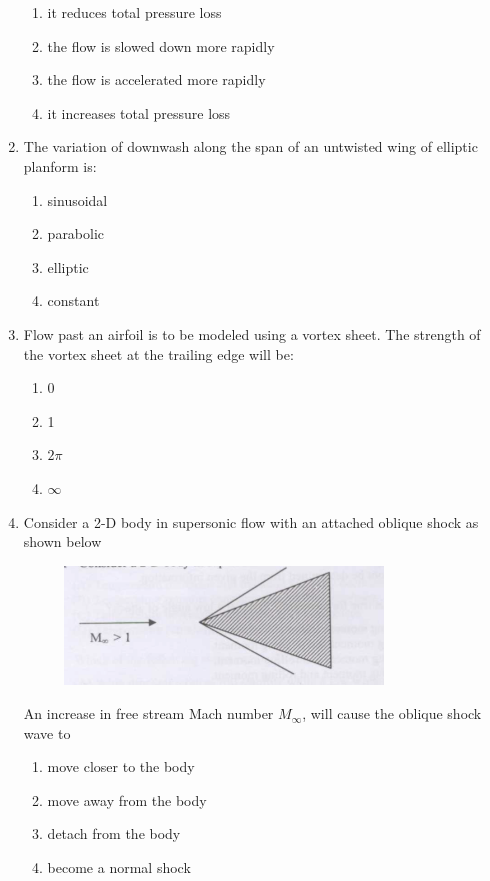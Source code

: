 \documentclass[journal]{IEEEtran}
\begin{document}
\begin{enumerate}[start=35]
\begin{enumerate}
    \item it reduces total pressure loss
    \item the flow is slowed down more rapidly
    \item the flow is accelerated more rapidly
    \item it increases total pressure loss
\end{enumerate}
\item The variation of downwash along the span of an untwisted wing of elliptic planform is:
\begin{enumerate}
    \item sinusoidal
    \item parabolic
    \item elliptic
    \item constant
\end{enumerate}
\item Flow past an airfoil is to be modeled using a vortex sheet. The strength of the vortex sheet at the trailing edge will be:
\begin{enumerate}
    \item 0
    \item 1
    \item $2\pi$
    \item $\infty$
\end{enumerate}
\item Consider a 2-D body in supersonic flow with an attached oblique shock as shown below 
\begin{figure}[h]
    \centering
    \includegraphics[width=0.8\textwidth]{figs/Gate1.png}
    \caption{}
    \label{}
\end{figure}
An increase in free stream Mach number $M_{\infty}$, will cause the oblique shock wave to
\begin{enumerate}
    \item move closer to the body
    \item move away from the body
    \item detach from the body
    \item become a normal shock
\end{enumerate}
\end{enumerate}
\end{document}
